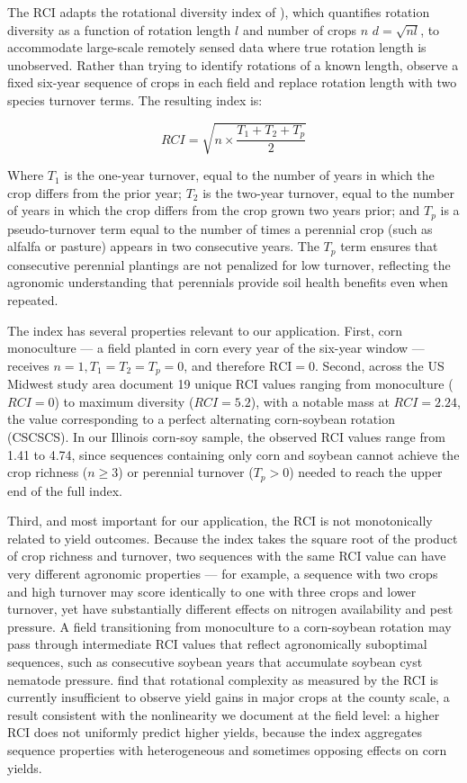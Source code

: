 \documentclass[11pt,letterpaper]{article}
\theoremstyle{remark}
\theoremstyle{plain}
\theoremstyle{definition}
\begin{document}
The RCI adapts the rotational diversity index of \cite{Tiemann2016}), which quantifies rotation diversity as a function of rotation length $l$ and number of crops $n$ $d = \sqrt{nl}$, to accommodate large-scale remotely sensed data where true rotation length is unobserved. Rather than trying to identify rotations of a known length, \cite{socolar2021} observe a fixed six-year sequence of crops in each field and replace rotation length with two species turnover terms. The resulting index is:

\begin{equation}
    RCI = \sqrt{n\times \dfrac{T_{1}+T_{2}+T_{p}}{2}}
\end{equation}

Where $T_{1}$ is the one-year turnover, equal to the number of years in which the crop differs from the prior year; $T_{2}$ is the two-year turnover, equal to the number of years in which the crop differs from the crop grown two years prior; and $T_{p}$ is a pseudo-turnover term equal to the number of times a perennial crop (such as alfalfa or pasture) appears in two consecutive years. The $T_{p}$ term ensures that consecutive perennial plantings are not penalized for low turnover, reflecting the agronomic understanding that perennials provide soil health benefits even when repeated. 

The index has several properties relevant to our application. First, corn monoculture — a field planted in corn every year of the six-year window — receives $n=1, T_{1}=T_{2}=T_{p}=0$, and therefore $\text{RCI} = 0$. Second, across the US Midwest study area \cite{socolar2021} document 19 unique RCI values ranging from monoculture ($RCI = 0$) to maximum diversity ($RCI = 5.2$), with a notable mass at $RCI = 2.24$, the value corresponding to a perfect alternating corn-soybean rotation (CSCSCS). In our Illinois corn-soy sample, the observed RCI values range from 1.41 to 4.74, since sequences containing only corn and soybean cannot achieve the crop richness ($n \geq 3$) or perennial turnover ($T_{p} > 0$) needed to reach the upper end of the full index.

Third, and most important for our application, the RCI is not monotonically related to yield outcomes. Because the index takes the square root of the product of crop richness and turnover, two sequences with the same RCI value can have very different agronomic properties — for example, a sequence with two crops and high turnover may score identically to one with three crops and lower turnover, yet have substantially different effects on nitrogen availability and pest pressure. A field transitioning from monoculture to a corn-soybean rotation may pass through intermediate RCI values that reflect agronomically suboptimal sequences, such as consecutive soybean years that accumulate soybean cyst nematode pressure. \cite{burchfield2024} find that rotational complexity as measured by the RCI is currently insufficient to observe yield gains in major crops at the county scale, a result consistent with the nonlinearity we document at the field level: a higher RCI does not uniformly predict higher yields, because the index aggregates sequence properties with heterogeneous and sometimes opposing effects on corn yields.
\end{document}
